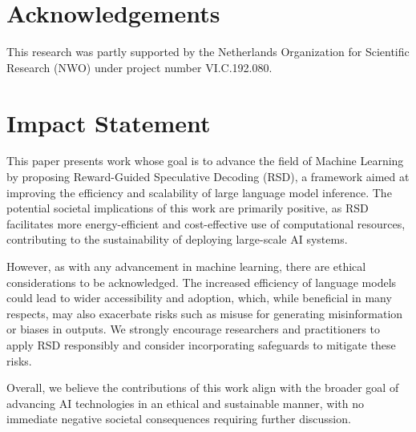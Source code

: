 \documentclass{article}
\theoremstyle{plain}
\theoremstyle{definition}
\theoremstyle{remark}
\begin{document}

\newpage 



\section*{Acknowledgements}
This research was partly supported by the Netherlands Organization for Scientific Research (NWO)
under project number VI.C.192.080.

\section*{Impact Statement}

This paper presents work whose goal is to advance the field of Machine Learning by proposing Reward-Guided Speculative Decoding (RSD), a framework aimed at improving the efficiency and scalability of large language model inference. The potential societal implications of this work are primarily positive, as RSD facilitates more energy-efficient and cost-effective use of computational resources, contributing to the sustainability of deploying large-scale AI systems.

However, as with any advancement in machine learning, there are ethical considerations to be acknowledged. The increased efficiency of language models could lead to wider accessibility and adoption, which, while beneficial in many respects, may also exacerbate risks such as misuse for generating misinformation or biases in outputs. We strongly encourage researchers and practitioners to apply RSD responsibly and consider incorporating safeguards to mitigate these risks.

Overall, we believe the contributions of this work align with the broader goal of advancing AI technologies in an ethical and sustainable manner, with no immediate negative societal consequences requiring further discussion.

\end{document}
